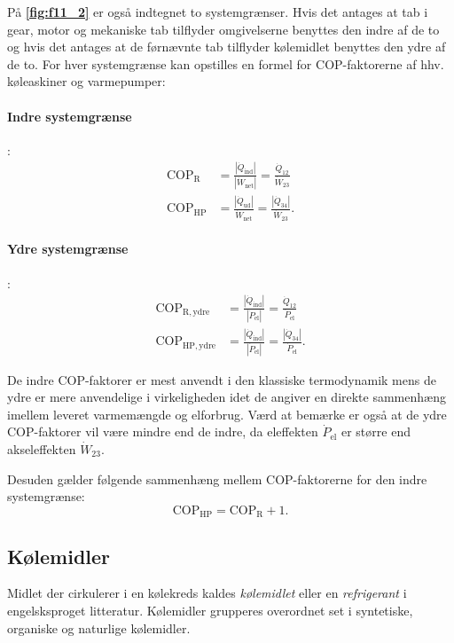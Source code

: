 På \textbf{\autoref{fig:f11_2}} er også indtegnet to systemgrænser. Hvis det antages at tab i gear, motor og mekaniske tab tilflyder omgivelserne benyttes den indre af de to og hvis det antages at de førnævnte tab tilflyder kølemidlet benyttes den ydre af de to. For hver systemgrænse kan opstilles en formel for $\mathrm{COP}$-faktorerne af hhv. køleaskiner og varmepumper:

\paragraph{Indre systemgrænse}:
\begin{align*}
  \mathrm{COP}_{\mathrm{R}} &= \frac{\left| \dot{Q}_{\mathrm{ind}} \right|}{\left| \dot{W}_{\mathrm{net}} \right|} = \frac{\dot{Q}_{12}}{\dot{W}_{23}} \\
  \mathrm{COP}_{\mathrm{HP}} &= \frac{\left| \dot{Q}_{\mathrm{ud}} \right|}{\dot{W}_{\mathrm{net}}} = \frac{\left| \dot{Q}_{34} \right|}{\dot{W}_{23}}
.\end{align*}

\paragraph{Ydre systemgrænse}:
\begin{align*}
  \mathrm{COP}_{\mathrm{R, ydre}} &= \frac{\left| \dot{Q}_{\mathrm{ind}} \right|}{\left| \dot{P}_{\mathrm{el}} \right|} = \frac{\dot{Q}_{12}}{\dot{P}_{\mathrm{el}}} \\
  \mathrm{COP}_{\mathrm{HP, ydre}} &= \frac{\left| \dot{Q}_{\mathrm{ind}} \right|}{\left| \dot{P}_{\mathrm{el}} \right|} = \frac{\left| \dot{Q}_{34} \right|}{\dot{P}_{\mathrm{el}}}
.\end{align*}

De indre COP-faktorer er mest anvendt i den klassiske termodynamik mens de ydre er mere anvendelige i virkeligheden idet de angiver en direkte sammenhæng imellem leveret varmemængde og elforbrug. Værd at bemærke er også at de ydre COP-faktorer vil være mindre end de indre, da eleffekten $\dot{P}_{\mathrm{el}}$ er større end akseleffekten $\dot{W}_{23}$. 

Desuden gælder følgende sammenhæng mellem COP-faktorerne for den indre systemgrænse:
\[ 
\mathrm{COP}_{\mathrm{HP}} = \mathrm{COP}_{\mathrm{R}} + 1
.\]


\subsection{Kølemidler}
Midlet der cirkulerer i en kølekreds kaldes \textit{kølemidlet} eller en \textit{refrigerant} i engelsksproget litteratur. Kølemidler grupperes overordnet set i syntetiske, organiske og naturlige kølemidler.

